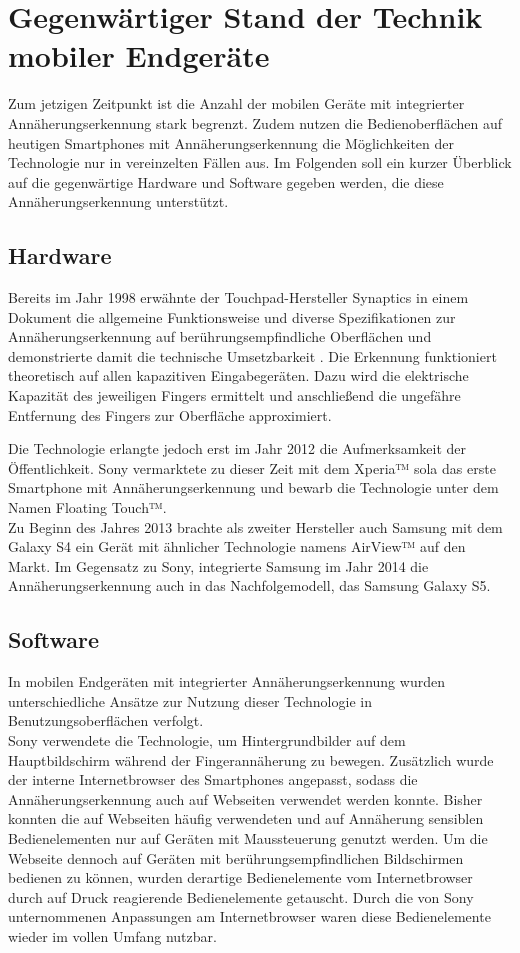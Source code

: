 \documentclass[12pt,numbers=noenddot,parskip,bibliography=totocnumbered,listof=totocnumbered]{scrreprt}
\begin{document}
\section{Gegenwärtiger Stand der Technik mobiler Endgeräte}
Zum jetzigen Zeitpunkt ist die Anzahl der mobilen Geräte mit integrierter Annäherungserkennung stark begrenzt. Zudem nutzen die Bedienoberflächen auf heutigen Smartphones mit Annäherungserkennung die Möglichkeiten der Technologie nur in vereinzelten Fällen aus. Im Folgenden soll ein kurzer Überblick auf die gegenwärtige Hardware und Software gegeben werden, die diese Annäherungserkennung unterstützt.

\subsection{Hardware}
Bereits im Jahr 1998 erwähnte der Touchpad-Hersteller Synaptics in einem Dokument die allgemeine Funktionsweise und diverse Spezifikationen zur Annäherungserkennung auf berührungsempfindliche Oberflächen und demonstrierte damit die technische Umsetzbarkeit \citep{synaptics}. Die Erkennung funktioniert theoretisch auf allen kapazitiven Eingabegeräten. Dazu wird die elektrische Kapazität des jeweiligen Fingers ermittelt und anschließend die ungefähre Entfernung des Fingers zur Oberfläche approximiert.

Die Technologie erlangte jedoch erst im Jahr 2012 die Aufmerksamkeit der Öffentlichkeit. Sony vermarktete zu dieser Zeit mit dem Xperia™ sola das erste Smartphone mit Annäherungserkennung und bewarb die Technologie unter dem Namen Floating Touch™.\\
Zu Beginn des Jahres 2013 brachte als zweiter Hersteller auch Samsung mit dem Galaxy S4 ein Gerät mit ähnlicher Technologie namens AirView™ auf den Markt. Im Gegensatz zu Sony, integrierte Samsung im Jahr 2014 die Annäherungserkennung auch in das Nachfolgemodell, das Samsung Galaxy S5.

\subsection{Software}
In mobilen Endgeräten mit integrierter Annäherungserkennung wurden unterschiedliche Ansätze zur Nutzung dieser Technologie in Benutzungsoberflächen verfolgt.\\
Sony verwendete die Technologie, um Hintergrundbilder auf dem Hauptbildschirm während der Fingerannäherung zu bewegen. Zusätzlich wurde der interne Internetbrowser des Smartphones angepasst, sodass die Annäherungserkennung auch auf Webseiten verwendet werden konnte. Bisher konnten die auf Webseiten häufig verwendeten und auf Annäherung sensiblen Bedienelementen nur auf Geräten mit Maussteuerung genutzt werden. Um die Webseite dennoch auf Geräten mit berührungsempfindlichen Bildschirmen bedienen zu können, wurden derartige Bedienelemente vom Internetbrowser durch auf Druck reagierende Bedienelemente getauscht. Durch die von Sony unternommenen Anpassungen am Internetbrowser waren diese Bedienelemente wieder im vollen Umfang nutzbar.
\end{document}
